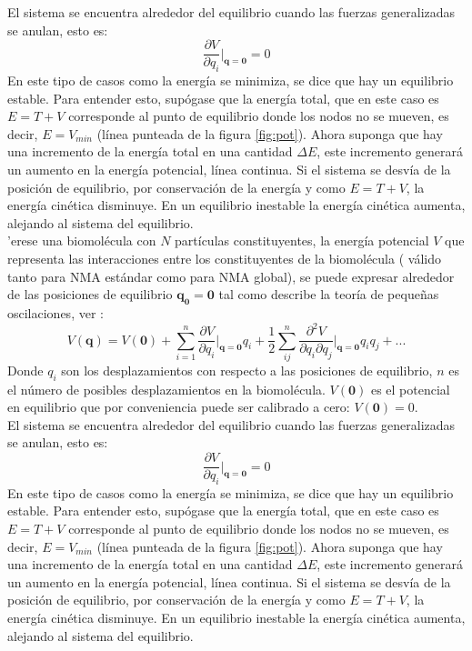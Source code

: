 El sistema se encuentra alrededor del equilibrio cuando las fuerzas generalizadas se anulan, esto es:
\begin{equation}\label{eq:2}
\frac{\partial V}{\partial q_i}\bigg|_{\mathbf{q}=\mathbf{0}}=0
\end{equation}
En este tipo de casos como la energ\'{i}a se minimiza, se dice que hay un equilibrio estable. Para entender esto, sup\'{o}gase que la energ\'{i}a total, que en este caso es $E=T+V$ corresponde al punto de equilibrio donde los nodos no se mueven, es decir, $E=V_{min}$ (l\'{i}nea punteada de la figura \ref{fig:pot}). Ahora suponga que hay una incremento de la energ\'{i}a total en una cantidad $\Delta E$, este incremento generar\'{a} un aumento en la energ\'{i}a potencial, l\'{i}nea continua.  Si el sistema se desv\'{i}a de la posici\'{o}n de equilibrio, por conservaci\'{o}n de la energ\'{i}a y como $E=T+V$, la energ\'{i}a cin\'{e}tica disminuye. En un equilibrio inestable la energ\'{i}a cin\'{e}tica aumenta, alejando al sistema del equilibrio. \cite{Goldstein2001} \\
'{e}rese una biomol\'{e}cula con $N$ part\'{i}culas constituyentes, la energ\'{i}a potencial $V$ que representa las interacciones entre los constituyentes de la biomol\'{e}cula ( v\'{a}lido tanto para NMA est\'{a}ndar como para NMA global), se puede expresar alrededor de las posiciones de equilibrio $\mathbf{q_0}=\mathbf{0}$ tal como describe la teor\'{i}a de peque\~{n}as oscilaciones, ver \cite{Goldstein2001}:
\begin{equation}\label{eq:1}
V(\mathbf{q})=V(\mathbf{0})+\sum_{i=1}^n\frac{\partial V}{\partial q_i}\bigg|_{\mathbf{q}=\mathbf{0}}q_i+\frac{1}{2}\sum_{ij}^{n}\frac{\partial^2 V }{\partial q_i\partial q_j}\bigg|_{\mathbf{q}=\mathbf{0}}q_i q_j+...
\end{equation}
Donde $q_i$ son los desplazamientos con respecto a las posiciones de equilibrio, $n$ es el n\'{u}mero de posibles desplazamientos en la biomol\'{e}cula. $V(\mathbf{0})$ es el potencial en equilibrio que por conveniencia puede ser calibrado a cero: $V(\mathbf{0})=0$. \\


El sistema se encuentra alrededor del equilibrio cuando las fuerzas generalizadas se anulan, esto es:
\begin{equation}\label{eq:2}
\frac{\partial V}{\partial q_i}\bigg|_{\mathbf{q}=\mathbf{0}}=0
\end{equation}
En este tipo de casos como la energ\'{i}a se minimiza, se dice que hay un equilibrio estable. Para entender esto, sup\'{o}gase que la energ\'{i}a total, que en este caso es $E=T+V$ corresponde al punto de equilibrio donde los nodos no se mueven, es decir, $E=V_{min}$ (l\'{i}nea punteada de la figura \ref{fig:pot}). Ahora suponga que hay una incremento de la energ\'{i}a total en una cantidad $\Delta E$, este incremento generar\'{a} un aumento en la energ\'{i}a potencial, l\'{i}nea continua.  Si el sistema se desv\'{i}a de la posici\'{o}n de equilibrio, por conservaci\'{o}n de la energ\'{i}a y como $E=T+V$, la energ\'{i}a cin\'{e}tica disminuye. En un equilibrio inestable la energ\'{i}a cin\'{e}tica aumenta, alejando al sistema del equilibrio. \cite{Goldstein2001} \\


